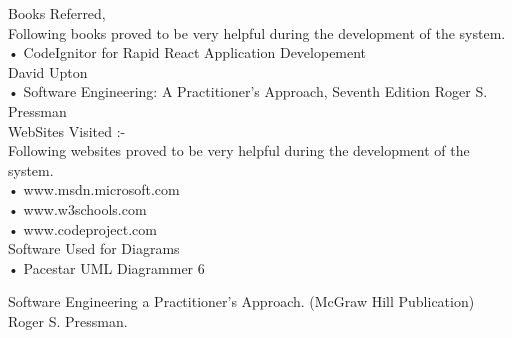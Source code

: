 \renewcommand\bibname{References}
\begin{thebibliography}{99}





 Books Referred,\\
Following books proved to be very helpful during the development of the system.\\
•	CodeIgnitor for Rapid React Application Developement\\
David Upton\\
•	Software Engineering: A Practitioner’s Approach, Seventh Edition
Roger S. Pressman\\
 WebSites Visited :-\\
Following websites proved to be very helpful during the development of the system.\\
•	www.msdn.microsoft.com\\
•	www.w3schools.com\\
•	www.codeproject.com\\



 Software Used for Diagrams\\
•	Pacestar UML Diagrammer 6

 Software Engineering a Practitioner’s Approach. (McGraw Hill Publication) 		Roger S. Pressman.
\end{thebibliography}
